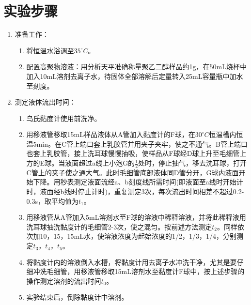 \documentclass[12pt,hyperref,a4paper,UTF8]{ctexart}
\begin{document}
\section{实验步骤}
\begin{enumerate}
    \item 准备工作：
    \begin{enumerate}
        \item 将恒温水浴调至$35^{\circ}C$。
        \item 配置高聚物溶液：用分析天平准确称量聚乙二醇样品约1g，在50mL烧杯中加入10mL溶剂去离子水，待固体全部溶解后定量转入25mL容量瓶中加水至刻度。
    \end{enumerate}
    \item 测定液体流出时间：

    \begin{enumerate}
\item 乌氏黏度计使用前洗净。

\item 用移液管移取15mL样品液体从A管加入黏度计的F球，在$30^{\circ}C$恒温槽内恒温5min。在C管上端口套上乳胶管并用夹子夹牢，使之不通气。B管上端口也套上乳胶管，接上洗耳球慢慢抽吸，使样品从F球经D球上升至毛细管上方的E球。当液面超过a线上小泡G的$\frac{1}{2}$处时，停止抽气，移去洗耳球，打开C管上的夹子使之通大气。此时毛细管底部液体同D管分开，G球内液面开始下降。用秒表测定液面流经a、b刻度线所需时间(即液面至a线时开始计时，液面经b线时停止计时)，重复测定3次，每次流出时间相差不超过0.2-0.3s，取平均值为$t_1$。

\item  用移液管从A管加入5mL溶剂水至F球的溶液中稀释溶液，并将此稀释液用洗耳球抽洗黏度计的毛细管2-3次，使之混匀。按前述方法测定$t_2$。同样依次加10，15，15mL水，使溶液浓度为起始浓度的1/2，1/3，1/4，分别测定$t_3$，$t_4$，$t_5$。

\item 将黏度计内的溶液倒入水槽，将黏度计用去离子水冲洗干净，尤其是要仔细冲洗毛细管，用移液管移取15mL溶剂水至黏度计F球中，按上述步骤的操作测定溶剂的流出时间$t_0$。

\item 实验结束后，倒除黏度计中溶剂。
\end{enumerate}


\end{enumerate}
\end{document}
